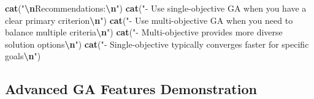 \documentclass[
]{article}
\newenvironment{Shaded}{\begin{snugshade}}{\end{snugshade}}
\newcommand{\FunctionTok}[1]{\textcolor[rgb]{0.13,0.29,0.53}{\textbf{#1}}}
\newcommand{\NormalTok}[1]{#1}
\newcommand{\SpecialCharTok}[1]{\textcolor[rgb]{0.81,0.36,0.00}{\textbf{#1}}}
\newcommand{\StringTok}[1]{\textcolor[rgb]{0.31,0.60,0.02}{#1}}
\begin{document}
\begin{Shaded}
\begin{Highlighting}[]
\FunctionTok{cat}\NormalTok{(}\StringTok{"}\SpecialCharTok{\textbackslash{}n}\StringTok{Recommendations:}\SpecialCharTok{\textbackslash{}n}\StringTok{"}\NormalTok{)}
\FunctionTok{cat}\NormalTok{(}\StringTok{"{-} Use single{-}objective GA when you have a clear primary criterion}\SpecialCharTok{\textbackslash{}n}\StringTok{"}\NormalTok{)}
\FunctionTok{cat}\NormalTok{(}\StringTok{"{-} Use multi{-}objective GA when you need to balance multiple criteria}\SpecialCharTok{\textbackslash{}n}\StringTok{"}\NormalTok{)}
\FunctionTok{cat}\NormalTok{(}\StringTok{"{-} Multi{-}objective provides more diverse solution options}\SpecialCharTok{\textbackslash{}n}\StringTok{"}\NormalTok{)}
\FunctionTok{cat}\NormalTok{(}\StringTok{"{-} Single{-}objective typically converges faster for specific goals}\SpecialCharTok{\textbackslash{}n}\StringTok{"}\NormalTok{)}
\end{Highlighting}
\end{Shaded}

\subsection{Advanced GA Features
Demonstration}\label{advanced-ga-features-demonstration}
\end{document}

